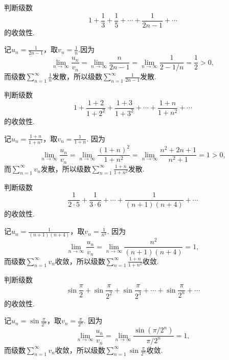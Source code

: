 \begin{example}
判断级数\[
1 + \frac{1}{3} + \frac{1}{5} + \dotsb + \frac{1}{2n-1} + \dotsb
\]的收敛性.
\begin{solution}
记\(u_n = \frac{1}{2n-1}\)，取\(v_n = \frac{1}{n}\).因为\[
\lim\limits_{n\to\infty} \frac{u_n}{v_n} = \lim\limits_{n\to\infty} \frac{n}{2n-1} = \lim\limits_{n\to\infty} \frac{1}{2-1/n} = \frac{1}{2} > 0,
\]而级数\(\sum\limits_{n=1}^\infty \frac{1}{n}\)发散，所以级数\(\sum\limits_{n=1}^\infty \frac{1}{2n-1}\)发散.
\end{solution}
\end{example}

\begin{example}
判断级数\[
1 + \frac{1+2}{1+2^2} + \frac{1+3}{1+3^2} + \dotsb + \frac{1+n}{1+n^2} + \dotsb
\]的收敛性.
\begin{solution}
记\(u_n = \frac{1+n}{1+n^2}\)，取\(v_n = \frac{1}{1+n}\).
因为\[
\lim\limits_{n\to\infty} \frac{u_n}{v_n}
= \lim\limits_{n\to\infty} \frac{(1+n)^2}{1+n^2}
= \lim\limits_{n\to\infty} \frac{n^2 + 2n + 1}{n^2 + 1}
= 1 > 0,
\]而\(\sum\limits_{n=1}^\infty v_n\)发散，所以级数\(\sum\limits_{n=1}^\infty \frac{1+n}{1+n^2}\)发散.
\end{solution}
\end{example}

\begin{example}
判断级数\[
\frac{1}{2\cdot5} + \frac{1}{3\cdot6} + \dotsb + \frac{1}{(n+1)(n+4)} + \dotsb
\]的收敛性.
\begin{solution}
记\(u_n = \frac{1}{(n+1)(n+4)}\)，取\(v_n = \frac{1}{n^2}\).
因为\[
\lim\limits_{n\to\infty} \frac{u_n}{v_n} = \lim\limits_{n\to\infty} \frac{n^2}{(n+1)(n+4)} = 1,
\]而级数\(\sum\limits_{n=1}^\infty v_n\)收敛，所以级数\(\sum\limits_{n=1}^\infty \frac{1+n}{1+n^2}\)收敛.
\end{solution}
\end{example}

\begin{example}
\newcommand\sinfrac[1][]{\sin\frac{\pi}{2^{#1}}}
判断级数\[
\sinfrac + \sinfrac[2] + \sinfrac[3] + \dotsb + \sinfrac[n] + \dotsb
\]的收敛性.
\begin{solution}
记\(u_n = \sin\frac{\pi}{2^n}\)，取\(v_n = \frac{\pi}{2^n}\).
因为\[
\lim\limits_{n\to\infty} \frac{u_n}{v_n}
= \lim\limits_{n\to\infty} \frac{\sin(\pi/2^n)}{\pi/2^n} = 1,
\]而级数\(\sum\limits_{n=1}^\infty v_n\)收敛，所以级数\(\sum\limits_{n=1}^\infty \sin\frac{\pi}{2^n}\)收敛.
\end{solution}
\end{example}


